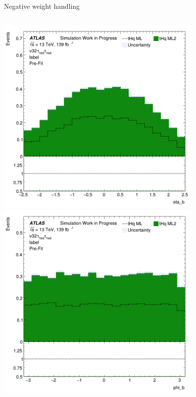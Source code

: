 \begin{frame}{Negative weight handling}
  \begin{columns}
    \begin{column}{0.5\textwidth}
      \includegraphics[width=0.8\textwidth]{eta_b}
      \includegraphics[width=0.8\textwidth]{phi_b}
    \end{column}
    \begin{column}{0.5\textwidth}

\end{column}
\end{columns}
\end{frame}

